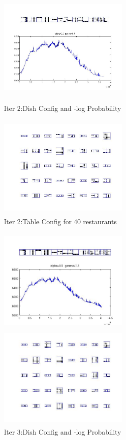 \documentclass{article}
\begin{document}
\begin{spacing}{1.1}
\begin{figure}[h]
\begin{minipage}[b]{0.5\textwidth}
    \centering 
    \includegraphics[width=2.5in,height=2in]{init1_5_nmt85_2d.jpg} 
    \caption{Iter 2:Dish Config and -log Probability}
    \label{fig:by:table} 
  \end{minipage}%
  \begin{minipage}[b]{0.5\textwidth} 
    \centering 
    \includegraphics[width=2.5in,height=2in]{init1_5_nmt85_2.jpg} 
    \caption{Iter 2:Table Config for 40 restaurants}
    \label{fig:by:table}  
   \end{minipage}%
\end{figure}
\begin{figure}[h] 
  \begin{minipage}[b]{0.5\textwidth} 
    \centering 
    \includegraphics[width=2.5in,height=2in]{init1_5_nmt85_3d.jpg} 
    \caption{Iter 3:Dish Config and -log Probability}
    \label{fig:by:table} 
  \end{minipage}%
  \begin{minipage}[b]{0.5\textwidth} 
    \centering 
    \includegraphics[width=2.5in,height=2in]{init1_5_nmt85_3.jpg} 

\end{minipage}
\end{figure}
\end{spacing}
\end{document}
